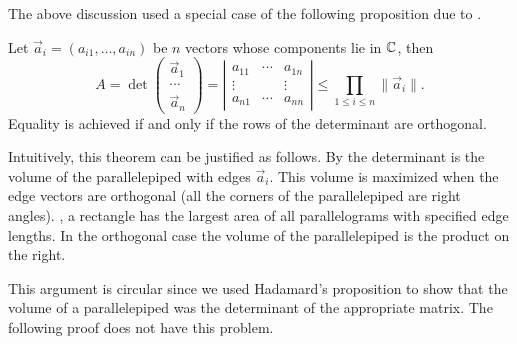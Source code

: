 \smallskip
The above discussion used a special case of the following proposition due to
{\Hadamard} \cite{Hadamard1893-xq}. 

\begin{proposition}[Hadamard] \label{Hadamard:Ineq:Prop}
Let $\vec a_{i} = (a_{i1}, \ldots, a_{in})$ be $n$ vectors whose
components lie in $\mathbb{C}$, then
\[
A = \det\left( \begin{array}{c} \vec{a}_1 \\ \cdots \\ \vec{a}_n \end{array}\right)
 = \left|
 \begin{array}{cccc}
a_{11} & \cdots & a_{1n} \\
\vdots &  & \vdots \\
a_{n1} & \cdots & a_{nn} 
\end{array}
\right| \le
\prod_{1 \le i \le n} \|\vec a_{i} \|.
\]
Equality is achieved if and only if the rows of the determinant are
orthogonal. 
\end{proposition}

Intuitively, this theorem can be justified as follows.  By
 the determinant is the volume of the
parallelepiped with edges $\vec{a}_i$.  This volume is maximized when
the edge vectors are orthogonal (all the corners of the
parallelepiped are right angles).  \Eg, a rectangle has the largest
area of all parallelograms with specified edge lengths.  In the
orthogonal case the volume of the parallelepiped is the product on
the right.  

This argument is circular since we used Hadamard's proposition to show
that the volume of a parallelepiped was the determinant of the
appropriate matrix.  The following proof does not have this problem. 

